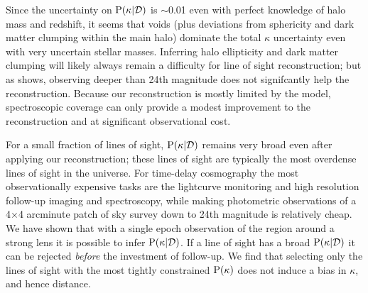 \documentclass[useAMS,usenatbib]{mn2e}
\begin{document}
Since the uncertainty on ${\rm P}(\kappa|{\mathcal{D}})$ is $\sim$0.01 even
with perfect knowledge of halo mass and redshift, it seems that voids
(plus deviations from sphericity and dark matter clumping within the
main halo) dominate the total $\kappa$ uncertainty even with very
uncertain stellar masses. Inferring halo ellipticity and dark matter
clumping will likely always remain a difficulty for line of sight
reconstruction; but as  shows, observing deeper
than 24th magnitude does not signifcantly help the reconstruction.
Because our reconstruction is mostly limited by the model, spectroscopic
coverage can only provide a modest improvement to the reconstruction and
at significant observational cost.

For a small fraction of lines of sight, ${\rm P}(\kappa|{\mathcal{D}})$ remains very
broad even after applying our reconstruction; these lines of sight are
typically the most overdense lines of sight in the universe. For
time-delay cosmography the most observationally expensive tasks are the
lightcurve monitoring and high resolution follow-up imaging and spectroscopy,
while making photometric observations of a
4$\times$4 arcminute patch of sky survey down to 24th magnitude is
relatively cheap. We have shown that with a single epoch observation of
the region around a strong lens it is possible to infer ${\rm P}(\kappa|{\mathcal{D}})$.
If a line of sight has a broad ${\rm P}(\kappa|{\mathcal{D}})$ it can be rejected {\it
before} the investment of follow-up. We find that
selecting only the lines of sight with the most tightly constrained
${\rm P}(\kappa)$ does not induce a bias in $\kappa$, and hence distance.
\end{document}

